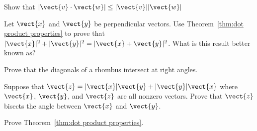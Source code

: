 \begin{enumialphparenastyle}
\begin{ex}
Show that $|\vect{v}\cdot\vect{w}|\le|\vect{v}||\vect{w}|$
\end{ex}

\begin{ex}
Let $\vect{x}$ and $\vect{y}$ be perpendicular vectors.  Use
Theorem~\ref{thm:dot product properties} to prove that $|\vect{x}|^2+|\vect{y}|^2=|\vect{x}+\vect{y}|^2$.  What is this result better known as?
\end{ex}

\begin{ex}
Prove that the diagonals of a rhombus intersect at right angles. 
\end{ex}

\begin{ex}
Suppose that $\vect{z}=|\vect{x}| \vect{y} + |\vect{y}| \vect{x}$
where $\vect{x}$, $\vect{y}$, and $\vect{z}$ are all nonzero vectors.  Prove
that $\vect{z}$ bisects the angle between $\vect{x}$ and $\vect{y}$.
\end{ex}

\begin{ex}
Prove Theorem~\ref{thm:dot product properties}.
\end{ex}

\end{enumialphparenastyle}
